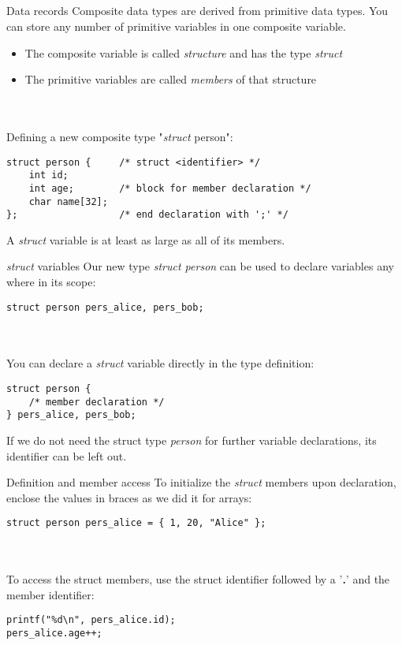 \subsection{}
\begin{frame}[fragile]{Data records}
	Composite data types are derived from primitive data types. You can store any number of primitive variables in one composite variable.
	\begin{itemize}
		\item The composite variable is called \textit{structure} and has the type \textit{struct}
		\item The primitive variables are called \textit{members} of that structure
	\end{itemize} \ \\ \ \\
	Defining a new composite type "\textit{struct} person":
	\begin{lstlisting}[numbers=none]
struct person {		/* struct <identifier> */
	int id;
	int age;		/* block for member declaration */
	char name[32];
};					/* end declaration with ';' */
\end{lstlisting}
	A \textit{struct} variable is at least as large as all of its members.
\end{frame}
\begin{frame}[fragile]{\textit{struct} variables}
	Our new type \textit{struct person} can be used to declare variables any where in its scope:
	\begin{lstlisting}[numbers=none]
struct person pers_alice, pers_bob;
\end{lstlisting} \ \\ \ \\
	You can declare a \textit{struct} variable directly in the type definition:
	\begin{lstlisting}[numbers=none]
struct person {
	/* member declaration */
} pers_alice, pers_bob;
\end{lstlisting}
	If we do not need the struct type \textit{person} for further variable declarations, its identifier can be left out.
\end{frame}
\begin{frame}[fragile]{Definition and member access}
	To initialize the \textit{struct} members upon declaration, enclose the values in braces as we did it for arrays:
	\begin{lstlisting}[numbers=none]
struct person pers_alice = { 1, 20, "Alice" };
\end{lstlisting} \ \\ \ \\
	To access the struct members, use the struct identifier followed by a '\textbf{.}' and the member identifier:
	\begin{lstlisting}[numbers=none]
printf("%d\n", pers_alice.id);
pers_alice.age++;
\end{lstlisting}
\end{frame}
